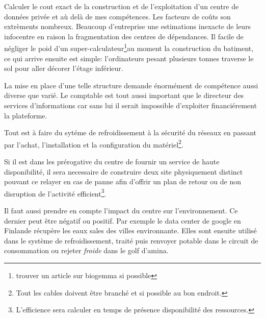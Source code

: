 \documentclass[11pt, a4paper ]{article}
\begin{document}
\begin{spacing}{1.5}

Calculer le cout exact de la construction et de l'exploitation d'un centre de données privée et aù delà de mes compétences. Les facteurs de coûts son extrèments nombreux. Beaucoup d'entreprise une estimations inexacte de leurs infocentre en raison la fragmentation des centres de dépendances. Il facile de négliger le poid d'un super-calculateur\footnote{trouver un article sur biogemma si possible}au moment la construction du batiment, ce qui arrive ensuite est simple: l'ordinateurs pesant plusieurs tonnes traverse le sol pour aller décorer l'étage inférieur.

La mise en place d'une telle structure demande énormément de compétence aussi diverse que varié. Le comptable est tout aussi important que le directeur des services d'informations car sans lui il serait impossible d'exploiter financiérement la plateforme. 

Tout est à faire du sytéme de refroidissement à la sécurité du réseaux en passant par l'achat, l'installation et la configuration du matériel\footnote{Tout les cables doivent être branché et si possible au bon endroit.}. 

Si il est dans les prérogative du centre de fournir un service de haute disponibilité, il sera necessaire de construire deux site physiquement distinct pouvant ce relayer en cas de panne afin d'offrir un plan de retour ou de non disruption de l'activité efficient\footnote{L'efficience sera calculer en temps de présence disponibilité des ressources.}. 

Il faut aussi prendre en compte l'impact du centre sur l'environnement. Ce dernier peut être négatif ou positif. Par exemple le data center de google en Finlande récupère les eaux sales des villes environnante. Elles sont ensuite utilisé dans le système de refroidissement, traité puis renvoyer potable dans le circuit de consommation ou rejeter \emph{froide} dans le golf d'amina.


\end{spacing}
\end{document}
